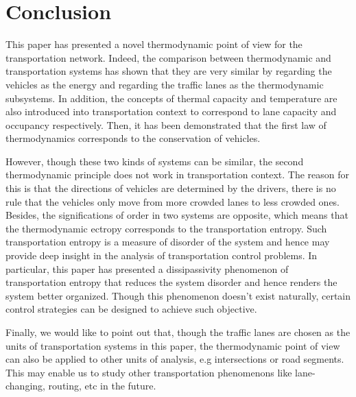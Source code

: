 \documentclass[preprint,authoryear,12pt]{elsarticle}
\renewcommand{\vec}[1]{\mbox{\boldmath$#1$}}
\begin{document}

\section{Conclusion}

This paper has presented a novel thermodynamic point of view for the
transportation network. Indeed, the comparison between thermodynamic
and transportation systems has shown that they are very similar by
regarding the vehicles as the energy and regarding the traffic lanes
as the thermodynamic subsystems. In addition, the concepts of thermal
capacity and temperature are also introduced into transportation
context to correspond to lane capacity and occupancy respectively.
Then, it has been demonstrated that the first law of thermodynamics
corresponds to the conservation of vehicles.

However, though these two kinds of systems can be similar, the second
thermodynamic principle does not work in transportation context. The
reason for this is that  the directions of vehicles are determined by
the drivers, there is no rule that the vehicles only move from more
crowded lanes to less crowded ones. Besides, the significations of
order in two systems are opposite, which means that the thermodynamic
ectropy corresponds to the transportation entropy. Such
transportation entropy is a measure of disorder of the system and
hence may provide deep insight in the analysis of transportation
control problems.
In particular, this paper has presented a dissipassivity phenomenon
of transportation entropy that reduces the system disorder and hence
renders the system better organized. Though this phenomenon doesn't
exist naturally, certain control strategies can be designed to
achieve such objective.

Finally, we would like to point out that, though the traffic lanes
are chosen as the units of transportation systems in this paper, the
thermodynamic point of view can also be applied to other units of
analysis, e.g intersections or road segments. This may enable us to
study other transportation phenomenons like lane-changing, routing,
etc in the future.



\end{document}
